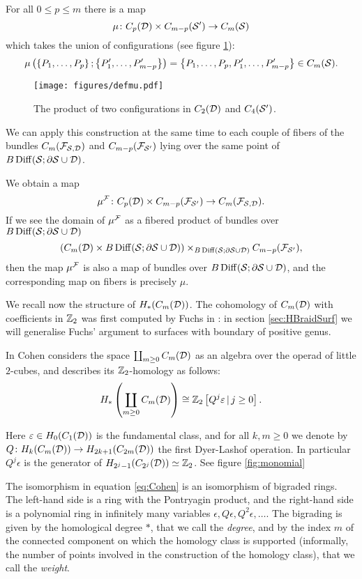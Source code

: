 \begin{defn}
\label{defn:muF}
For all $0\leq p\leq m$ there is a map
\[
 \mu\colon C_p(\D)\times C_{m-p}(\S')\to \cms
\]
which takes the union of configurations (see figure \ref{fig:defmu}):
 \[
  \mu\pa{\set{P_1,\dots,P_p};\set{P'_1,\dots,P'_{m-p}}}=\set{P_1,\dots,P_p,P'_1,\dots,P'_{m-p}}\in\cms.
 \]
\begin{figure}\centering
 \texttt{[image: figures/defmu.pdf]}
 \caption{The product of two configurations in $C_2(\D)$ and $C_4(\S')$.}
\label{fig:defmu}
\end{figure}
 
We can apply this construction at the same time to each couple of fibers of the bundles $C_m(\cF_{\S,\D})$ and $C_{m-p}(\cF_{\S'})$
lying over the same point of $ B\Diff(\S;\partial\S\cup\D)$.

We obtain a map
\[
 \mu^{\cF}\colon C_p(\D)\times C_{m-p}(\cF_{\S'})\to C_m(\cF_{\S,\D}).
\]
If we see the domain of $\mu^{\cF}$ as a fibered product of bundles over $B\Diff(\S;\partial\S\cup\D)$
\[
 \pa{C_m(\D)\times B\Diff(\S;\partial\S\cup\D)}\times_{B\Diff(\S;\partial\S\cup\D)}C_{m-p}(\cF_{\S'}),
\]
then the map $\mu^{\cF}$ is also a map of bundles over $B\Diff(\S;\partial\S\cup\D)$, and the corresponding
map on fibers is precisely $\mu$.
\end{defn}

We recall now the structure of $H_*(C_m(\D))$.
The cohomology of $C_m(\D)$ with coefficients in $\Z_2$ was first computed by Fuchs in
\cite{Fuchs:CohomBraidModtwo}: in section
\ref{sec:HBraidSurf} we will generalise  Fuchs' argument to surfaces with boundary of positive genus.

In \cite[Chap.III]{CLM} Cohen considers the space $\coprod_{m\geq 0}C_m(\D)$ as an
algebra over the operad of little $2$-cubes, and describes its
$\Z_2$-homology as follows:
\begin{equation}
 \label{eq:Cohen}
H_*\pa{\coprod_{m\geq 0}C_m(\D)}\cong \Z_2\left[Q^j\epsilon \, |\, j\geq 0\right].
\end{equation}

Here $\epsilon\in H_0(C_1(\D))$ is the fundamental class, and for all
$k,m\geq 0$ we denote by $Q\colon H_k(C_m(\D))\to H_{2k+1}(C_{2m}(\D))$
the first Dyer-Lashof operation. In particular $Q^j\epsilon$ is the generator of
$H_{2^j-1}(C_{2^j}(\D))\simeq\Z_2$. See figure \ref{fig:monomial}

The isomorphism in equation \eqref{eq:Cohen} is
an isomorphism of bigraded rings. The left-hand side is a ring with the Pontryagin product,
and the right-hand side is a polynomial ring in infinitely many variables $\epsilon,Q\epsilon,Q^2\epsilon,\dots$.
The bigrading is given by the homological degree
$*$, that we call the \emph{degree},
and by the index $m$ of the connected component
on which the homology class is supported (informally, the number of points
involved in the construction of the homology class), that we call the \emph{weight}.

